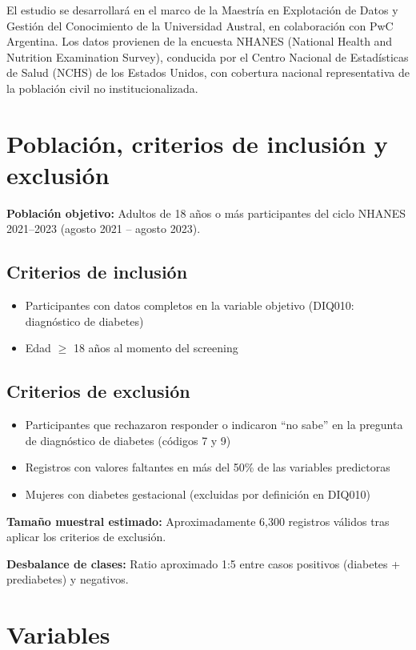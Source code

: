 \documentclass[12pt, a4paper]{report}
\begin{document}
El estudio se desarrollará en el marco de la Maestría en Explotación de Datos y Gestión del Conocimiento de la Universidad Austral, en colaboración con PwC Argentina. Los datos provienen de la encuesta NHANES (National Health and Nutrition Examination Survey), conducida por el Centro Nacional de Estadísticas de Salud (NCHS) de los Estados Unidos, con cobertura nacional representativa de la población civil no institucionalizada.

\section{Población, criterios de inclusión y exclusión}

\textbf{Población objetivo:} Adultos de 18 años o más participantes del ciclo NHANES 2021--2023 (agosto 2021 -- agosto 2023).

\subsection*{Criterios de inclusión}
\begin{itemize}
    \item Participantes con datos completos en la variable objetivo (DIQ010: diagnóstico de diabetes)
    \item Edad $\geq$ 18 años al momento del screening
\end{itemize}

\subsection*{Criterios de exclusión}
\begin{itemize}
    \item Participantes que rechazaron responder o indicaron ``no sabe'' en la pregunta de diagnóstico de diabetes (códigos 7 y 9)
    \item Registros con valores faltantes en más del 50\% de las variables predictoras
    \item Mujeres con diabetes gestacional (excluidas por definición en DIQ010)
\end{itemize}

\textbf{Tamaño muestral estimado:} Aproximadamente 6{,}300 registros válidos tras aplicar los criterios de exclusión.

\textbf{Desbalance de clases:} Ratio aproximado 1:5 entre casos positivos (diabetes + prediabetes) y negativos.

\section{Variables}
\end{document}
